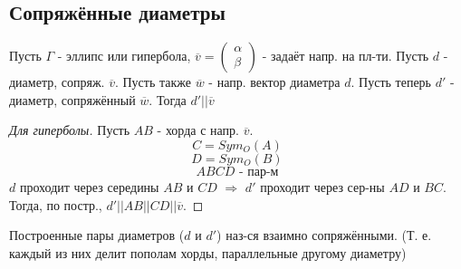 \subsection{Сопряжённые диаметры}
\begin{theorem}
Пусть $\Gamma$ - эллипс или гипербола, $\overline{v} = \begin{pmatrix} \alpha \\ \beta \end{pmatrix}$ - задаёт напр. на пл-ти. Пусть $d$ - диаметр, сопряж. $\overline{v}$. Пусть также $\overline{w}$ - напр. вектор диаметра $d$. Пусть теперь $d'$ - диаметр, сопряжённый $\overline{w}$. Тогда $d' || \overline{v}$
\end{theorem}
\begin{proof}[Для гиперболы]
  Пусть $AB$ - хорда с напр. $\overline{v}$. 
  \[
  C = Sym_O(A)
  \]
  \[
  D = Sym_O(B)
  \]
  \[
  ABCD \text{ - пар-м}
  \]
  $d$ проходит через середины $AB$ и $CD$ $\Rightarrow$ $d'$ проходит через сер-ны $AD$ и $BC$. Тогда, по постр., $d' || AB || CD || \overline{v}$.

\end{proof}
\begin{definition}
Построенные пары диаметров ($d$ и $d'$) наз-ся взаимно сопряжёнными. (Т. е. каждый из них делит пополам хорды, параллельные другому диаметру)
\end{definition}
